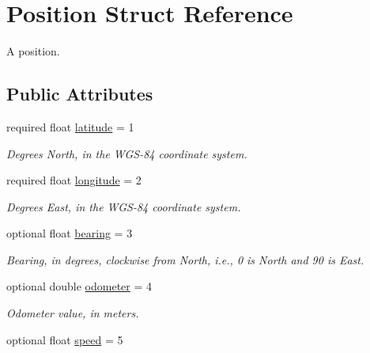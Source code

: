 \hypertarget{structPosition}{}\section{Position Struct Reference}
\label{structPosition}


A position.  


\subsection*{Public Attributes}
\begin{DoxyCompactItemize}
\item 
required float \hyperlink{structPosition_aee3ead66251dc2ad69ef681e3cacc452}{latitude} = 1\hypertarget{structPosition_aee3ead66251dc2ad69ef681e3cacc452}{}\label{structPosition_aee3ead66251dc2ad69ef681e3cacc452}

\begin{DoxyCompactList}\small\item\em Degrees North, in the W\+G\+S-\/84 coordinate system. \end{DoxyCompactList}\item 
required float \hyperlink{structPosition_aa7ff51d33d4a5f80c0aabf43a2e66f11}{longitude} = 2\hypertarget{structPosition_aa7ff51d33d4a5f80c0aabf43a2e66f11}{}\label{structPosition_aa7ff51d33d4a5f80c0aabf43a2e66f11}

\begin{DoxyCompactList}\small\item\em Degrees East, in the W\+G\+S-\/84 coordinate system. \end{DoxyCompactList}\item 
optional float \hyperlink{structPosition_add80884715080cf7a0f070820f9ca5a0}{bearing} = 3
\begin{DoxyCompactList}\small\item\em Bearing, in degrees, clockwise from North, i.\+e., 0 is North and 90 is East. \end{DoxyCompactList}\item 
optional double \hyperlink{structPosition_a6e5d7dc4b4fa9957deb07cb89370972d}{odometer} = 4\hypertarget{structPosition_a6e5d7dc4b4fa9957deb07cb89370972d}{}\label{structPosition_a6e5d7dc4b4fa9957deb07cb89370972d}

\begin{DoxyCompactList}\small\item\em Odometer value, in meters. \end{DoxyCompactList}\item 
optional float \hyperlink{structPosition_a7a7d9503a9f3cd15b28d4ee638770896}{speed} = 5\hypertarget{structPosition_a7a7d9503a9f3cd15b28d4ee638770896}{}\label{structPosition_a7a7d9503a9f3cd15b28d4ee638770896}


\end{DoxyCompactItemize}
